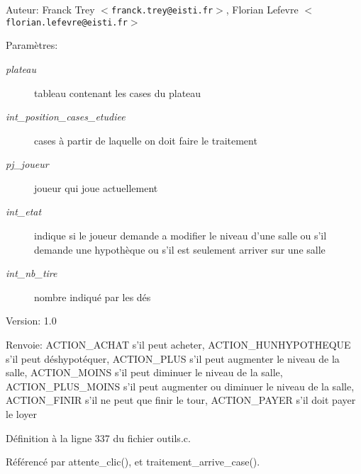 \begin{Desc}
\item[Auteur:]Franck Trey $<${\tt franck.trey@eisti.fr}$>$, Florian Lefevre $<${\tt florian.lefevre@eisti.fr}$>$\end{Desc}
\begin{Desc}
\item[Param\`{e}tres:]
\begin{description}
\item[{\em plateau}]tableau contenant les cases du plateau \item[{\em int\_\-position\_\-cases\_\-etudiee}]cases \`{a} partir de laquelle on doit faire le traitement \item[{\em pj\_\-joueur}]joueur qui joue actuellement \item[{\em int\_\-etat}]indique si le joueur demande a modifier le niveau d'une salle ou s'il demande une hypoth\`{e}que ou s'il est seulement arriver sur une salle \item[{\em int\_\-nb\_\-tire}]nombre indiqu\'{e} par les d\'{e}s\end{description}
\end{Desc}
\begin{Desc}
\item[Version:]1.0 \end{Desc}
\begin{Desc}
\item[Renvoie:]ACTION\_\-ACHAT s'il peut acheter, ACTION\_\-HUNHYPOTHEQUE s'il peut d\'{e}shypot\'{e}quer, ACTION\_\-PLUS s'il peut augmenter le niveau de la salle, ACTION\_\-MOINS s'il peut diminuer le niveau de la salle, ACTION\_\-PLUS\_\-MOINS s'il peut augmenter ou diminuer le niveau de la salle, ACTION\_\-FINIR s'il ne peut que finir le tour, ACTION\_\-PAYER s'il doit payer le loyer \end{Desc}


D\'{e}finition \`{a} la ligne 337 du fichier outils.c.

R\'{e}f\'{e}renc\'{e} par attente\_\-clic(), et traitement\_\-arrive\_\-case().

